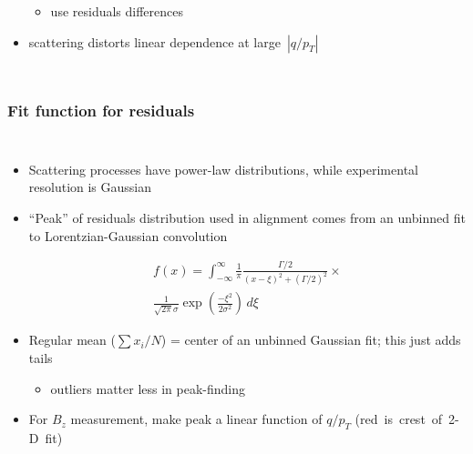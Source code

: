 \documentclass[compress]{beamer}
\begin{document}
\begin{frame}
\begin{columns}
\begin{itemize}
\vspace{-0.2 cm}
\begin{itemize}
\item use residuals differences
\end{itemize}

\item scattering distorts linear dependence at \mbox{large $|q/p_T|$\hspace{-1 cm}}
\end{itemize}

\vspace{-1.5 cm}
\mbox{ }
\end{columns}
\end{frame}

\begin{frame}
\frametitle{Fit function for residuals}

\vspace{0.2 cm}
\begin{columns}

\vspace{-0.35 cm}
\begin{itemize}
\item Scattering processes have power-law distributions, while experimental resolution is Gaussian

\item ``Peak'' of residuals distribution used in alignment comes from an unbinned fit to Lorentzian-Gaussian convolution

\vspace{-0.5 cm}
\begin{multline*}
f(x) = \int_{-\infty}^\infty \frac{1}{\pi}\frac{\Gamma/2}{(x - \xi)^2 + (\Gamma/2)^2} \times \\
\frac{1}{\sqrt{2\pi} \sigma} \exp\left(\frac{-\xi^2}{2 \sigma^2}\right) \, d\xi
\end{multline*}

\item Regular mean ($\sum x_i/N$) = center of an unbinned Gaussian fit; this just adds tails
\begin{itemize}
\item outliers matter less in peak-finding
\end{itemize}

\item For $B_z$ measurement, make peak a linear function of $q/p_T$ \mbox{(red is crest of 2-D fit)\hspace{-1 cm}}
\end{itemize}


\end{columns}
\end{frame}
\end{document}
